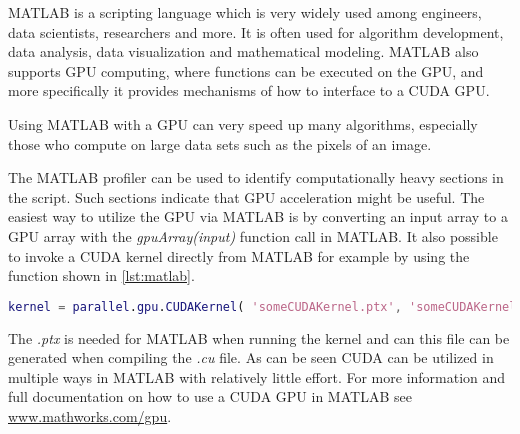 MATLAB is a scripting language which is very widely used among engineers, data scientists, researchers and more.
It is often used for algorithm development, data analysis, data visualization and mathematical modeling.
MATLAB also supports GPU computing, where functions can be executed on the GPU, and more specifically it provides mechanisms of how to interface to a CUDA GPU.

Using MATLAB with a GPU can very speed up many algorithms, especially those who compute on large data sets such as the pixels of an image.

The MATLAB profiler can be used to identify computationally heavy sections in the script. 
Such sections indicate that GPU acceleration might be useful.
The easiest way to utilize the GPU via MATLAB is by converting an input array to a GPU array with the \textit{gpuArray(input)} function call in MATLAB.
It also possible to invoke a CUDA kernel directly from MATLAB for example by using the function shown in \autoref{lst:matlab}.
\begin{lstlisting}[language=matlab,caption={Invoking CUDA kernel in MATLAB},label=lst:matlab]
	kernel = parallel.gpu.CUDAKernel( 'someCUDAKernel.ptx', 'someCUDAKernel.cu' );
\end{lstlisting}
The \textit{.ptx} is needed for MATLAB when running the kernel and can this file can be generated when compiling the \textit{.cu} file.
As can be seen CUDA can be utilized in multiple ways in MATLAB with relatively little effort.
For more information and full documentation on how to use a CUDA GPU in MATLAB see \url{www.mathworks.com/gpu}.